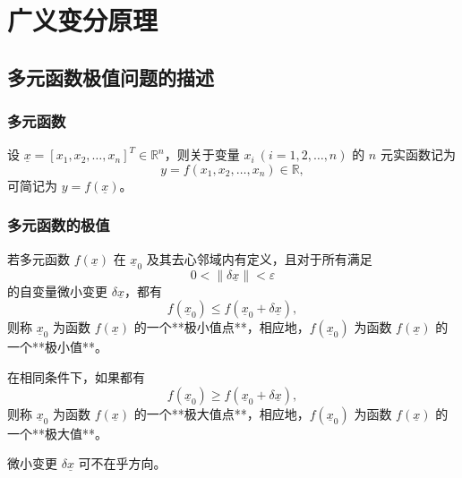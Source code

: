 \chapter{广义变分原理}
\section{多元函数极值问题的描述}
\subsection{多元函数}
设 \( \underline{x} = [x_1, x_2, \dots, x_n]^T \in \mathbb{R}^n \)，则关于变量 \( x_i \ (i=1,2,\dots,n) \) 的 \( n \) 元实函数记为
\[
y = f(x_1, x_2, \dots, x_n) \in \mathbb{R},
\]
可简记为 \( y = f(\underline{x}) \)。

\subsection{多元函数的极值}
\begin{definition}[极小值与极小值点]
若多元函数 \( f(\underline{x}) \) 在 \( \underline{x}_0 \) 及其去心邻域内有定义，且对于所有满足
\[
0 < \|\delta \underline{x}\| < \varepsilon
\]
的自变量微小变更 \( \delta \underline{x} \)，都有
\[
f(\underline{x}_0) \leq f(\underline{x}_0 + \delta \underline{x}),
\]
则称 \( \underline{x}_0 \) 为函数 \( f(\underline{x}) \) 的一个**极小值点**，相应地，\( f(\underline{x}_0) \) 为函数 \( f(\underline{x}) \) 的一个**极小值**。
\end{definition}

\begin{definition}[极大值与极大值点]
在相同条件下，如果都有
\[
f(\underline{x}_0) \geq f(\underline{x}_0 + \delta \underline{x}),
\]
则称 \( \underline{x}_0 \) 为函数 \( f(\underline{x}) \) 的一个**极大值点**，相应地，\( f(\underline{x}_0) \) 为函数 \( f(\underline{x}) \) 的一个**极大值**。
\end{definition}

\begin{remark}
微小变更 \( \delta \underline{x} \) 可不在乎方向。
\end{remark}

